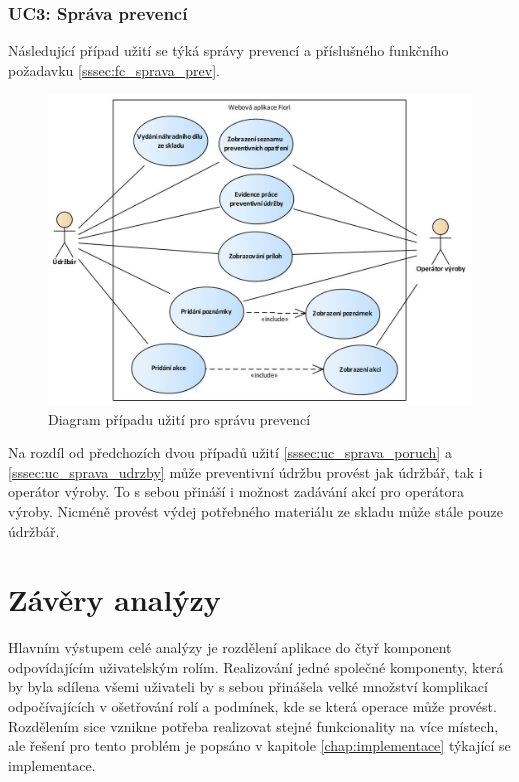 \documentclass[thesis=M,czech]{FITthesis}[2012/06/26]
\begin{document}
\subsubsection{UC3: Správa prevencí}
\label{sssec:uc_sprava_prevenci}
Následující případ užití se týká správy prevencí a příslušného funkčního požadavku \ref{sssec:fc_sprava_prev}.
\begin{figure}[H]
	\centering
	\includegraphics[width=1\textwidth]{images/ea_sprava_prevenci}
	\caption{Diagram případu užití pro správu prevencí}
	\label{img:uc_prevence}
\end{figure}
Na rozdíl od předchozích dvou případů užití \ref{sssec:uc_sprava_poruch} a \ref{sssec:uc_sprava_udrzby} může preventivní údržbu provést jak údržbář, tak i operátor výroby. To s sebou přináší i možnost zadávání akcí pro operátora výroby. Nicméně provést výdej potřebného materiálu ze skladu může stále pouze údržbář. 
\section{Závěry analýzy}
\label{sec:zav_analyzy}
Hlavním výstupem celé analýzy je rozdělení aplikace do čtyř komponent odpovídajícím uživatelským rolím. Realizování jedné společné komponenty, která by byla sdílena všemi uživateli by s sebou přinášela velké množství komplikací odpočívajících v ošetřování rolí a podmínek, kde se která operace může provést. Rozdělením sice vznikne potřeba realizovat stejné funkcionality na více místech, ale řešení pro tento problém je popsáno v kapitole \ref{chap:implementace} týkající se implementace.

\end{document}
